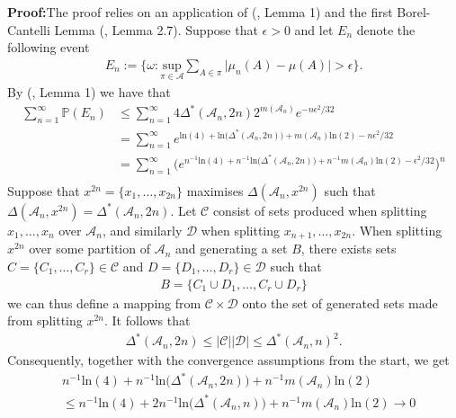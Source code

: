 \documentclass{report}
\begin{document}
\noindent\textbf{Proof:}\quad The proof relies on an application of (\cite{Consistency}, Lemma 1) and the first Borel-Cantelli Lemma (\cite{Martingales}, Lemma 2.7).
Suppose that $\epsilon > 0$ and let $E_n$ denote the following event
\begin{align*}
	E_n := \big\{\omega : \underset{\pi \in \mathcal{A}}{\text{sup}}\sum_{A \in \pi} \big|\mu_n(A) - \mu(A)\big| > \epsilon \big\}.
\end{align*}
By (\cite{Consistency}, Lemma 1) we have that
\begin{align*}
	\sum_{n=1}^\infty \mathbb{P}(E_n) &\leq  \sum_{n=1}^\infty 4\Delta^*(\mathcal{A}_n, 2n)2^{m(\mathcal{A}_n)} e^{-n\epsilon^2/32} \\
					  &= \sum_{n=1}^\infty e^{\text{ln}(4) + \text{ln}\big(\Delta^*(\mathcal{A}_n, 2n)\big) + {m(\mathcal{A}_n)}\text{ln}(2)  -n\epsilon^2/32} \\
					  &= \sum_{n=1}^\infty \bigg(e^{n^{-1}\text{ln}(4) + n^{-1}\text{ln}\big(\Delta^*(\mathcal{A}_n, 2n)\big) + n^{-1}{m(\mathcal{A}_n)}\text{ln}(2)  -\epsilon^2/32}\bigg)^n \\
\end{align*}
Suppose that $x^{2n} = \{x_1,\dots,x_{2n}\}$ maximises $\Delta(\mathcal{A}_n, x^{2n})$ such that $\Delta(\mathcal{A}_n, x^{2n}) = \Delta^*(\mathcal{A}_n, 2n)$.
Let $\mathcal{C}$ consist of sets produced when splitting $x_1,\dots,x_n$ over $\mathcal{A}_n$,
and similarly $\mathcal{D}$ when splitting $x_{n+1},\dots,x_{2n}$. 
When splitting $x^{2n}$ over some partition of $\mathcal{A}_n$ and generating a set $B$, there exists sets $C = \{C_1,\dots,C_r\} \in \mathcal{C}$ and $D = \{D_1,\dots,D_r\} \in \mathcal{D}$ such that 
\begin{align*}
	B = \{C_1 \cup D_1, \dots, C_r \cup D_r\}
\end{align*}
we can thus define a mapping from $\mathcal{C}\times\mathcal{D}$ onto the set of generated sets made from splitting $x^{2n}$. It follows that 
\begin{align*}
	\Delta^*(\mathcal{A}_n, 2n) \leq |\mathcal{C}||\mathcal{D}| \leq \Delta^*(\mathcal{A}_n, n)^2.
\end{align*}
Consequently, together with the convergence assumptions from the start, we get 
\begin{align*}
	&n^{-1}\text{ln}(4) + n^{-1}\text{ln}\big(\Delta^*(\mathcal{A}_n, 2n)\big) + n^{-1}{m(\mathcal{A}_n)}\text{ln}(2) \\
	&\leq n^{-1}\text{ln}(4) + 2n^{-1}\text{ln}\big(\Delta^*(\mathcal{A}_n, n)\big) + n^{-1}{m(\mathcal{A}_n)}\text{ln}(2) \rightarrow 0
\end{align*}
\end{document}
